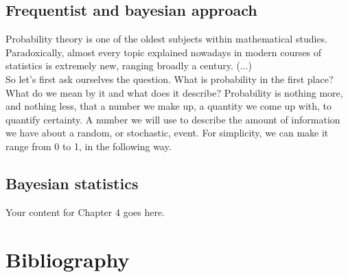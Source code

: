 \documentclass{book}
\begin{document}
\section{Frequentist and bayesian approach}
Probability theory is one of the oldest subjects within mathematical studies. Paradoxically, almost every topic explained nowadays in modern courses of statistics is extremely new, ranging broadly a century. (...)\\

So let's first ask ourselves the question. What is probability in the first place? What do we mean by it and what does it describe? Probability is nothing more, and nothing less, that a number we make up, a quantity we come up with, to quantify certainty. A number we will use to describe the amount of information we have about a random, or stochastic, event. For simplicity, we can make it range from 0 to 1, in the following way.

\section{Bayesian statistics}
Your content for Chapter 4 goes here.

\backmatter

\chapter*{Bibliography}
\end{document}
